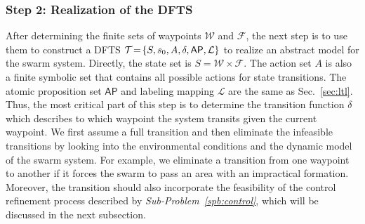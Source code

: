 \documentclass[letterpaper, 10 pt, conference]{ieeeconf}
\begin{document}
 
\subsubsection{Step 2: Realization of the DFTS}
After determining the finite sets of waypoints $\mathcal{W}$ and $\mathcal{F}$, the next step is to use them to construct a DFTS $\mathcal{T}\!=\!\{S, s_0, A, \delta, \mathsf{AP}, \mathcal{L}\}$ to realize an abstract model for the swarm system. Directly, the state set is $S\!=\!\mathcal{W}\!\times\!\mathcal{F}$. The action set $A$ is also a finite symbolic set that contains all possible actions for state transitions. The atomic proposition set $\mathsf{AP}$ and labeling mapping $\mathcal{L}$ are the same as Sec.~\ref{sec:ltl}.
Thus, the most critical part of this step is to determine the transition function $\delta$ which describes to which waypoint the system transits given the current waypoint. We first assume a full transition and then eliminate the infeasible transitions by looking into the environmental conditions and the dynamic model of the swarm system.
%
%
For example, we eliminate a transition from one waypoint to another if it forces the swarm to pass an area with an impractical formation.
Moreover, the transition should also incorporate the feasibility of the control refinement process described by \textit{Sub-Problem~\ref{spb:control}}, which will be discussed in the next subsection.

\end{document}

